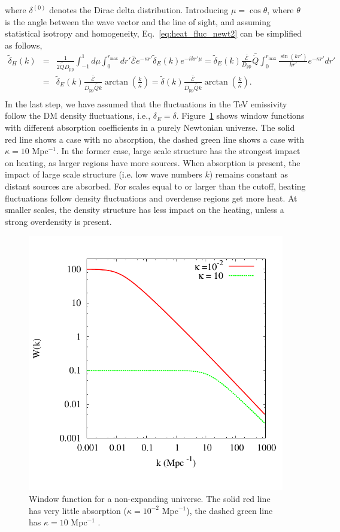 \documentclass[numberedappendix]{emulateapj}
\begin{document}
where $\delta^{(0)}$ denotes the Dirac delta distribution. Introducing $\mu=\cos\theta$, where $\theta$ is the angle between the wave vector and the line of sight, and assuming statistical isotropy and homogeneity, Eq.~\eqref{eq:heat_fluc_newt2} can be simplified as follows,
\begin{eqnarray}
  \label{eq:heat_fluc_newt3}
  \tilde{\delta}_H(k)&=&  
  \frac{1}{2\bar{\dot{Q}}D_{\mathrm{pp}}} \int_{-1}^{1} d\mu \int_0^{r_{\mathrm{max}}}dr'  \bar{\mathcal{E}} e^{-\kappa r'} \tilde{\delta}_E(k) e^{-ikr'\mu}
  =\tilde{\delta}_E(k)\frac{\bar{\mathcal{E}}}{D_{\mathrm{pp}}} {\bar{\dot{Q}}}\int_0^{r_{\mathrm{max}}} \frac{\sin(kr')}{kr'} e^{-\kappa r'}   dr'\\ \nonumber
 &=&\tilde{\delta}_E(k)\frac{\bar{\mathcal{E}}}{ D_{\mathrm{pp}}\bar{\dot{Q}}k} \arctan\left(\frac{k}{\kappa}\right)
  =\tilde{\delta}(k)\frac{\bar{\mathcal{E}}}{D_{\mathrm{pp}} \bar{\dot{Q}}k} \arctan\left(\frac{k}{\kappa}\right).\\ 
\end{eqnarray}
In the last step, we have assumed that the fluctuations in the TeV emissivity follow the DM density fluctuations, i.e., $\delta_E=\delta$. 
Figure~\ref{fig:window_newt} shows  window functions with different absorption coefficients in a purely Newtonian universe. The solid red line shows a case with no absorption, the dashed green line shows a case with $\kappa=10$ Mpc$^{-1}$.  In the former case, large scale structure has the strongest impact on heating, as larger regions have more sources. When absorption is present,  the impact of large scale structure (i.e. low wave numbers $k$) remains constant as distant sources are absorbed. For scales equal to or larger than the cutoff, heating fluctuations follow density fluctuations and overdense regions get more heat. At smaller scales, the density structure has less impact on the heating, unless a strong overdensity is present.  

\begin{figure}
\centering
\includegraphics[width = .45\textwidth ]{newtonian_window}
\caption{Window function for a non-expanding universe. The solid red line has very little absorption ($\kappa=10^{-2}$ Mpc$^{-1}$), the dashed green line has $\kappa=10 $ Mpc$^{-1}$ .}
\label{fig:window_newt}
\end{figure}
\end{document}

